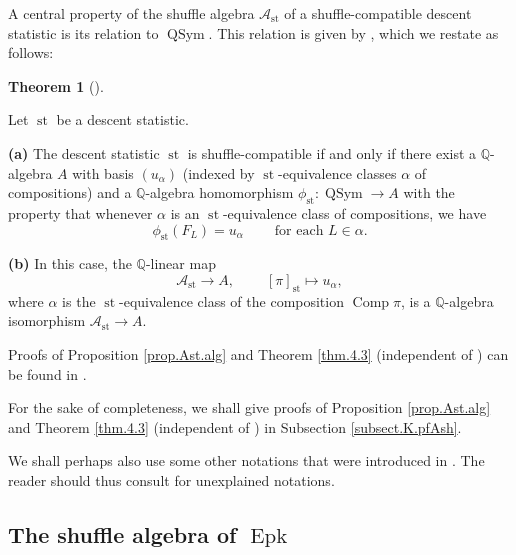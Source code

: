\documentclass[numbers=enddot,12pt,final,onecolumn,notitlepage]{scrartcl}%
\theoremstyle{definition}
\newtheorem{theo}{Theorem}[section]
\newenvironment{theorem}[1][]
{\begin{theo}[#1]\begin{leftbar}}
{\end{leftbar}\end{theo}}
\newenvironment{verlong}{}{}
\newenvironment{vershort}{}{}
\newenvironment{noncompile}{}{}
\begin{document}
A central property of the shuffle algebra $\mathcal{A}_{\operatorname*{st}}$
of a shuffle-compatible descent statistic is its relation to
$\operatorname*{QSym}$. This relation is given by \cite[Theorem 4.3]{part1},
which we restate as follows:

\begin{theorem}
\label{thm.4.3}Let $\operatorname*{st}$ be a descent statistic.

\textbf{(a)} The descent statistic $\operatorname*{st}$ is shuffle-compatible
if and only if there exist a $\mathbb{Q}$-algebra $A$ with basis $\left(
u_{\alpha}\right)  $ (indexed by $\operatorname*{st}$-equivalence classes
$\alpha$ of compositions) and a $\mathbb{Q}$-algebra homomorphism
$\phi_{\operatorname*{st}}:\operatorname*{QSym}\rightarrow A$ with the
property that whenever $\alpha$ is an $\operatorname*{st}$-equivalence class
of compositions, we have%
\[
\phi_{\operatorname*{st}}\left(  F_{L}\right)  =u_{\alpha}%
\ \ \ \ \ \ \ \ \ \ \text{for each }L\in\alpha.
\]


\textbf{(b)} In this case, the $\mathbb{Q}$-linear map%
\[
\mathcal{A}_{\operatorname*{st}}\rightarrow A,\ \ \ \ \ \ \ \ \ \ \left[
\pi\right]  _{\operatorname*{st}}\mapsto u_{\alpha},
\]
where $\alpha$ is the $\operatorname*{st}$-equivalence class of the
composition $\operatorname*{Comp}\pi$, is a $\mathbb{Q}$-algebra isomorphism
$\mathcal{A}_{\operatorname*{st}}\rightarrow A$.
\end{theorem}

\begin{vershort}
Proofs of Proposition \ref{prop.Ast.alg} and Theorem \ref{thm.4.3}
(independent of \cite{part1}) can be found in \cite{verlong}.
\end{vershort}

\begin{verlong}
For the sake of completeness, we shall give proofs of Proposition
\ref{prop.Ast.alg} and Theorem \ref{thm.4.3} (independent of \cite{part1}) in
Subsection \ref{subsect.K.pfAsh}.
\end{verlong}

\begin{noncompile}
We shall perhaps also use some other notations that were introduced in
\cite{part1}. The reader should thus consult \cite{part1} for unexplained notations.
\end{noncompile}

\subsection{The shuffle algebra of $\operatorname*{Epk}$}
\end{document}
